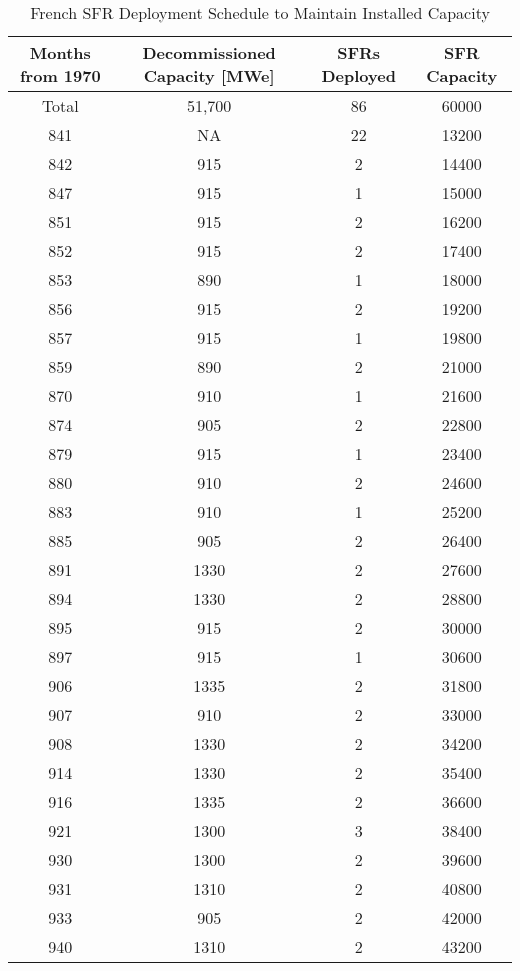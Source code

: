 \begin{table}[h]
	\centering
	\label{tab:sfr_deploy}
	\caption{French SFR Deployment Schedule to Maintain Installed Capacity}
	\begin{tabular}{|c|c|c|c|}	
		\hline
		Months from 1970 & Decommissioned Capacity [MWe] & \gls{SFR}s Deployed & \gls{SFR} Capacity \\ \hline
		Total & 51,700 & 86 &  60000\\ \hline
		841 & NA & 22 & 13200 \\ \hline
		842 & 915 & 2 & 14400 \\ \hline
		847 & 915 & 1 & 15000 \\ \hline
		851 & 915 & 2 & 16200 \\ \hline
		852 & 915 & 2 & 17400 \\ \hline
		853 & 890 & 1 & 18000 \\ \hline
		856 & 915 & 2 & 19200 \\ \hline
		857 & 915 & 1 & 19800 \\ \hline
		859 & 890 & 2 & 21000 \\ \hline
		870 & 910 & 1 & 21600 \\ \hline
		874 & 905 & 2 & 22800 \\ \hline
		879 & 915 & 1 & 23400 \\ \hline
		880 & 910 & 2 & 24600 \\ \hline
		883 & 910 & 1 & 25200 \\ \hline
		885 & 905 & 2 & 26400 \\ \hline
		891 & 1330 & 2 & 27600  \\ \hline
		894 & 1330 & 2 & 28800 \\ \hline
		895 & 915 & 2 & 30000 \\ \hline
		897 & 915 & 1 & 30600 \\ \hline
		906 & 1335 & 2 & 31800 \\ \hline
		907 & 910 & 2 & 33000 \\ \hline
		908 & 1330 & 2 & 34200 \\ \hline
		914 & 1330 & 2 & 35400 \\ \hline
		916 & 1335 & 2 & 36600 \\ \hline
		921 & 1300 & 3 & 38400 \\ \hline
		930 & 1300 & 2 & 39600 \\ \hline
		931 & 1310 & 2 & 40800 \\ \hline
		933 & 905 & 2 & 42000 \\ \hline
		940 & 1310 & 2 & 43200 \\ \hline

\end{tabular}
\end{table}
